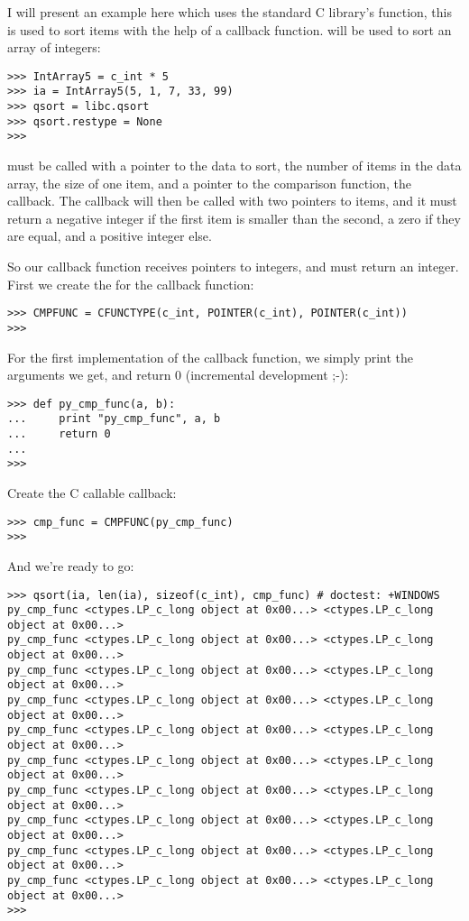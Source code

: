 I will present an example here which uses the standard C library's
 function, this is used to sort items with the help of a
callback function.  will be used to sort an array of
integers:
\begin{verbatim}
>>> IntArray5 = c_int * 5
>>> ia = IntArray5(5, 1, 7, 33, 99)
>>> qsort = libc.qsort
>>> qsort.restype = None
>>>
\end{verbatim}

 must be called with a pointer to the data to sort, the
number of items in the data array, the size of one item, and a pointer
to the comparison function, the callback. The callback will then be
called with two pointers to items, and it must return a negative
integer if the first item is smaller than the second, a zero if they
are equal, and a positive integer else.

So our callback function receives pointers to integers, and must
return an integer. First we create the  for the callback
function:
\begin{verbatim}
>>> CMPFUNC = CFUNCTYPE(c_int, POINTER(c_int), POINTER(c_int))
>>>
\end{verbatim}

For the first implementation of the callback function, we simply print
the arguments we get, and return 0 (incremental development ;-):
\begin{verbatim}
>>> def py_cmp_func(a, b):
...     print "py_cmp_func", a, b
...     return 0
...
>>>
\end{verbatim}

Create the C callable callback:
\begin{verbatim}
>>> cmp_func = CMPFUNC(py_cmp_func)
>>>
\end{verbatim}

And we're ready to go:
\begin{verbatim}
>>> qsort(ia, len(ia), sizeof(c_int), cmp_func) # doctest: +WINDOWS
py_cmp_func <ctypes.LP_c_long object at 0x00...> <ctypes.LP_c_long object at 0x00...>
py_cmp_func <ctypes.LP_c_long object at 0x00...> <ctypes.LP_c_long object at 0x00...>
py_cmp_func <ctypes.LP_c_long object at 0x00...> <ctypes.LP_c_long object at 0x00...>
py_cmp_func <ctypes.LP_c_long object at 0x00...> <ctypes.LP_c_long object at 0x00...>
py_cmp_func <ctypes.LP_c_long object at 0x00...> <ctypes.LP_c_long object at 0x00...>
py_cmp_func <ctypes.LP_c_long object at 0x00...> <ctypes.LP_c_long object at 0x00...>
py_cmp_func <ctypes.LP_c_long object at 0x00...> <ctypes.LP_c_long object at 0x00...>
py_cmp_func <ctypes.LP_c_long object at 0x00...> <ctypes.LP_c_long object at 0x00...>
py_cmp_func <ctypes.LP_c_long object at 0x00...> <ctypes.LP_c_long object at 0x00...>
py_cmp_func <ctypes.LP_c_long object at 0x00...> <ctypes.LP_c_long object at 0x00...>
>>>
\end{verbatim}

